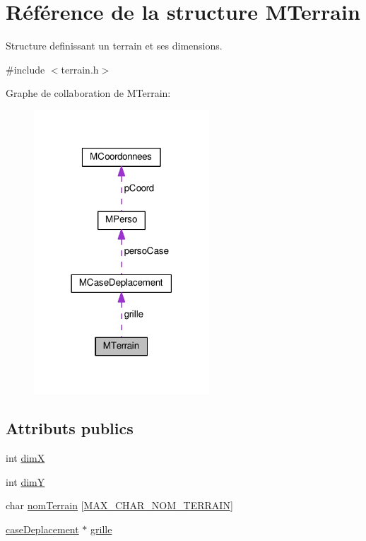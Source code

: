 \hypertarget{structMTerrain}{}\section{Référence de la structure M\+Terrain}
\label{structMTerrain}


Structure definissant un terrain et ses dimensions.  




{\ttfamily \#include $<$terrain.\+h$>$}



Graphe de collaboration de M\+Terrain\+:
\nopagebreak
\begin{figure}[H]
\begin{center}
\leavevmode
\includegraphics[width=186pt]{structMTerrain__coll__graph}
\end{center}
\end{figure}
\subsection*{Attributs publics}
\begin{DoxyCompactItemize}
\item 
int \hyperlink{structMTerrain_ae6f66d485448ae93c427e0586d6b12aa}{dimX}
\item 
int \hyperlink{structMTerrain_a638d309791fdf84d0267d75702bbab50}{dimY}
\item 
char \hyperlink{structMTerrain_a948d5d38016eed56187a94028e34f5e4}{nom\+Terrain} \mbox{[}\hyperlink{terrain_8h_a5f41c70ea486e890717560da2605f309}{M\+A\+X\+\_\+\+C\+H\+A\+R\+\_\+\+N\+O\+M\+\_\+\+T\+E\+R\+R\+A\+IN}\mbox{]}
\item 
\hyperlink{caseDeplacement_8h_aeab4f22b99f0db8b549dab4e46e3ead4}{case\+Deplacement} $\ast$ \hyperlink{structMTerrain_a392b4ed453bab400087d0bda7d452877}{grille}
\end{DoxyCompactItemize}


